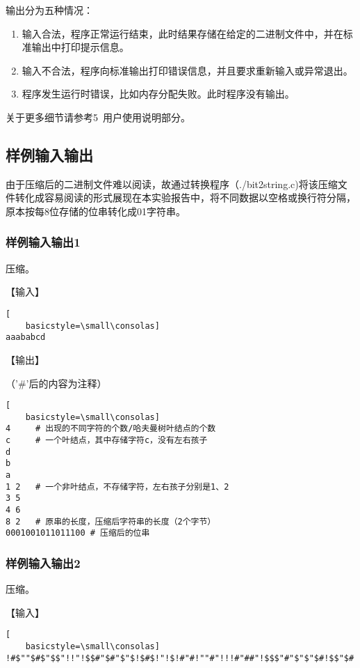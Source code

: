 \documentclass{article}
\begin{document}
输出分为五种情况：

\begin{enumerate}
    \item 输入合法，程序正常运行结束，此时结果存储在给定的二进制文件中，并在标准输出中打印提示信息。
    \item 输入不合法，程序向标准输出打印错误信息，并且要求重新输入或异常退出。
    \item 程序发生运行时错误，比如内存分配失败。此时程序没有输出。
\end{enumerate}

关于更多细节请参考5\ 用户使用说明部分。

\subsection{样例输入输出}

由于压缩后的二进制文件难以阅读，故通过转换程序（./bit2string.c)将该压缩文件转化成容易阅读的形式展现在本实验报告中，将不同数据以空格或换行符分隔，原本按每8位存储的位串转化成01字符串。

\subsubsection{样例输入输出1}

压缩。

【输入】

\begin{lstlisting}[
    basicstyle=\small\consolas]
aaababcd
\end{lstlisting}

【输出】

（'\#'后的内容为注释）

\begin{lstlisting}[
    basicstyle=\small\consolas]
4     # 出现的不同字符的个数/哈夫曼树叶结点的个数
c     # 一个叶结点，其中存储字符c，没有左右孩子 
d
b
a
1 2   # 一个非叶结点，不存储字符，左右孩子分别是1、2
3 5
4 6
8 2   # 原串的长度，压缩后字符串的长度（2个字节）
0001001011011100 # 压缩后的位串
\end{lstlisting}

\subsubsection{样例输入输出2}

压缩。

【输入】

\begin{lstlisting}[
    basicstyle=\small\consolas]
!#$""$#$"$$"!!"!$$#"$#"$"$!$#$!"!$!#"#!""#"!!!#"##"!$$$"#"$"$"$#!$$"$#!"#$##!!"#"#!!##!#$"!""$!"!#$$
\end{lstlisting}
\end{document}

